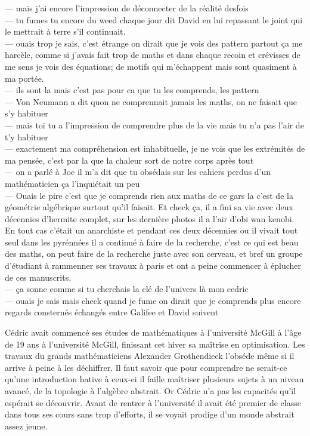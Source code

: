 \documentclass{article}
\begin{document}
--- mais j'ai encore l'impression de déconnecter de la réalité desfois\\
--- tu fumes tu encore du weed chaque jour dit David en lui repassant le joint qui le mettrait
à terre s'il continuait.\\
--- ouais trop je sais, c'est étrange on dirait que je vois des pattern partout ça me harcèle,
comme si j'avais fait trop de maths et dans chaque recoin et crévisses de me sens je vois des équations;
de motifs qui m'échappent mais sont quasiment à ma portée.\\
--- ils sont la mais c'est pas pour ca que tu les comprends, les pattern \\
--- Von Neumann a dit quon ne comprennait jamais les maths, on ne faisait que s'y habituer\\
--- mais toi tu a l'impression de comprendre plus de la vie mais tu n'a pas l'air de t'y habituer\\
--- exactement ma compréhension est inhabituelle, je ne vois que les extrémités de ma pensée,
c'est par la que la chaleur sort de notre corps après tout\\
---  on a parlé  à Joe il m'a dit que tu obsédais sur les cahiers perdus d'un mathématicien
ça l'inquiétait un peu\\
--- Ouais le pire c'est que je comprends rien aux maths de ce gars la c'est de la géométrie algébrique
surtout qu'il faisait. Et check ça, il a fini sa vie avec deux décennies d'hermite complet, sur les
dernière photos il a l'air d'obi wan kenobi. En tout cas c'était un anarchiste et pendant ces
deux décennies ou il vivait tout seul dans les pyrénnées il a continué à faire de la recherche,
c'est ce qui est beau des maths, on peut faire de la recherche juste avec son cerveau, et bref
un groupe d'étudiant à rammenner ses travaux à paris et ont a peine commencer à
éplucher de ces manuscrits.\\
--- ça sonne comme si tu cherchais la clé de l'univers là mon cedric\\
--- ouais je sais mais check quand je fume on dirait que je comprends plus encore\\

regards consternés échangés entre Galifee et David suivent\\

\clearpage

Cédric avait commencé ses études de mathématiques à l'université McGill à l'âge
de 19 ans à l'université McGill, finissant cet hiver sa maîtrise en
optimisation. Les travaux du grands mathématiciens Alexander Grothendieck
l'obséde même si il arrive à peine à les déchiffrer. Il faut savoir
que pour comprendre ne serait-ce qu'une introduction hative à ceux-ci il faille
maîtriser plusieurs sujets à un niveau avancé, de la topologie à l'algèbre
abstrait. Or Cédric n'a pas les capacités qu'il espérait se découvrir. Avant de
rentrer à l'université il avait été premier de classe dans tous ses cours sans
trop d'efforts, il se voyait prodige d'un monde abstrait assez jeune.\\
\end{document}
